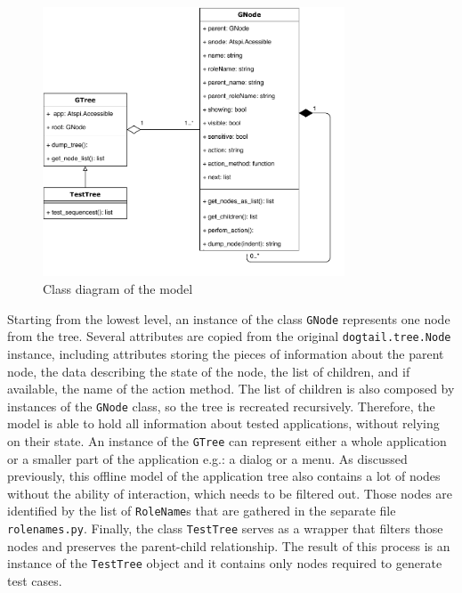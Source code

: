 \begin{figure}[hbt]
	\centering
	\includegraphics[width=0.8\textwidth,clip]{obrazky-figures/tree_diagram.pdf}
	\caption{Class diagram of the model}
	\label{tree_diagram}
\end{figure}

Starting from the lowest level, an instance of the class \texttt{GNode} represents one node from the tree. Several attributes are copied from the original \texttt{dogtail.tree.Node} instance, including attributes storing the pieces of information about the parent node, the data describing the state of the node, the list of children, and if available, the name of the action method. The list of children is also composed by instances of the \texttt{GNode} class, so the tree is recreated recursively. Therefore, the model is able to hold all information about tested applications, without relying on their state. An instance of the \texttt{GTree} can represent either a whole application or a smaller part of the application e.g.: a dialog or a menu. As discussed previously, this offline model of the application tree also contains a lot of nodes without the ability of interaction, which needs to be filtered out. Those nodes are identified by the list of \texttt{RoleName}s that are gathered in the separate file \texttt{rolenames.py}. Finally, the class \texttt{TestTree} serves as a wrapper that filters those nodes and preserves the parent-child relationship. The result of this process is an instance of the \texttt{TestTree} object and it contains only nodes required to generate test cases. 
